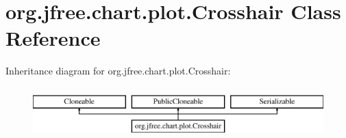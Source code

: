 \hypertarget{classorg_1_1jfree_1_1chart_1_1plot_1_1_crosshair}{}\section{org.\+jfree.\+chart.\+plot.\+Crosshair Class Reference}
\label{classorg_1_1jfree_1_1chart_1_1plot_1_1_crosshair}
Inheritance diagram for org.\+jfree.\+chart.\+plot.\+Crosshair\+:\begin{figure}[H]
\begin{center}
\leavevmode
\includegraphics[height=2.000000cm]{classorg_1_1jfree_1_1chart_1_1plot_1_1_crosshair}
\end{center}
\end{figure}
